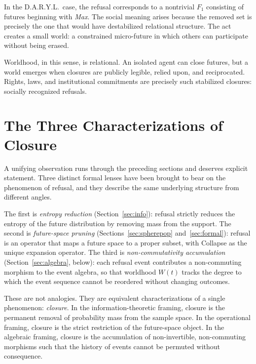 \documentclass[11pt]{article}
\begin{document}
In the D.A.R.Y.L.\ case, the refusal corresponds to a nontrivial $F_1$
consisting of futures beginning with \emph{Max}. The social meaning arises
because the removed set is precisely the one that would have destabilized
relational structure. The act creates a small world: a constrained micro-future
in which others can participate without being erased.

Worldhood, in this sense, is relational. An isolated agent can close futures,
but a world emerges when closures are publicly legible, relied upon, and
reciprocated. Rights, laws, and institutional commitments are precisely such
stabilized closures: socially recognized refusals.

\section{The Three Characterizations of Closure}
\label{sec:worldhood_unified}

A unifying observation runs through the preceding sections and deserves explicit
statement. Three distinct formal lenses have been brought to bear on the
phenomenon of refusal, and they describe the same underlying structure from
different angles.

The first is \emph{entropy reduction} (Section~\ref{sec:info}): refusal
strictly reduces the entropy of the future distribution by removing mass from
the support. The second is \emph{future-space pruning} (Sections~\ref{sec:spherepop}
and~\ref{sec:formal}): refusal is an operator that maps a future space to a
proper subset, with Collapse as the unique expansion operator. The third is
\emph{non-commutativity accumulation} (Section~\ref{sec:algebra}, below):
each refusal event contributes a non-commuting morphism to the event algebra,
so that worldhood $W(t)$ tracks the degree to which the event sequence cannot
be reordered without changing outcomes.

These are not analogies. They are equivalent characterizations of a single
phenomenon: \emph{closure}. In the information-theoretic framing, closure is the
permanent removal of probability mass from the sample space. In the operational
framing, closure is the strict restriction of the future-space object. In the
algebraic framing, closure is the accumulation of non-invertible, non-commuting
morphisms such that the history of events cannot be permuted without
consequence.
\end{document}
